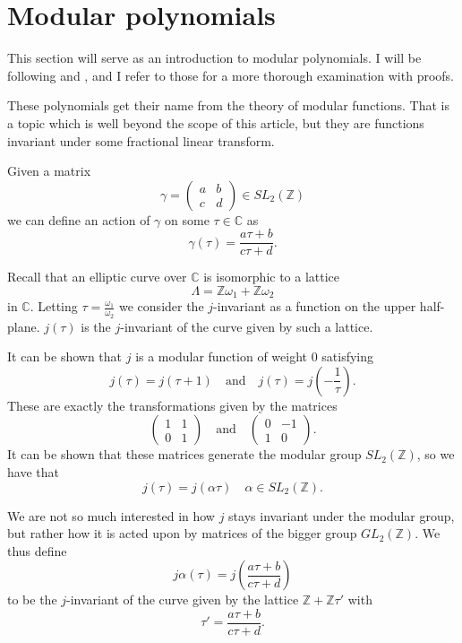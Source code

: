 \section{Modular polynomials}
This section will serve as an introduction to modular polynomials.
I will be following \cite{Lang2} and \cite{Adv}, and I refer to those for a more thorough examination
with proofs.

These polynomials get their name from the theory of modular functions. That is a topic which is
well beyond the scope of this article, but they are functions invariant under some fractional linear
transform. 

Given a matrix
$$ \gamma = \begin{pmatrix}
 a & b \\ c & d
\end{pmatrix} \in SL_2(\mathbb{Z})$$
we can define an action of $\gamma$ on some $\tau \in \mathbb{C}$ as
$$\gamma(\tau) = \frac{a\tau + b}{c\tau + d}. $$

Recall that an elliptic curve over $\mathbb{C}$ is isomorphic to a lattice
$$\Lambda = \mathbb{Z}\omega_1 + \mathbb{Z}\omega_2$$ in $\mathbb{C}$.
Letting $\tau = \frac{\omega_1}{\omega_2}$ we consider the $j$-invariant as a function
on the upper half-plane. $j(\tau)$ is the $j$-invariant of the curve given by such a lattice.

It can be shown that $j$ is a modular function of weight $0$ satisfying
$$ j(\tau) = j(\tau + 1) \quad \text{and} \quad j(\tau) = j(-\frac{1}{\tau}). $$
These are exactly the transformations given by the matrices
$$ \begin{pmatrix} 1 & 1 \\ 0 & 1 \end{pmatrix} \quad \text{and} \quad
   \begin{pmatrix} 0 & -1 \\ 1 & 0 \end{pmatrix}. $$
It can be shown that these matrices generate the modular group $SL_2(\mathbb{Z})$,
so we have that
$$j(\tau) = j(\alpha \tau) \quad \alpha \in SL_2(\mathbb{Z}). $$

We are not so much interested in how $j$ stays invariant under the modular group,
but rather how it is acted upon by matrices of the bigger group $GL_2(\mathbb{Z})$.
We thus define
$$ j \alpha(\tau) = j\left(\frac{a\tau + b}{c\tau + d}\right) $$
to be the $j$-invariant of the curve given by the lattice $\mathbb{Z}+\mathbb{Z}\tau'$
with $$\tau' = \frac{a\tau + b}{c\tau + d}.$$

